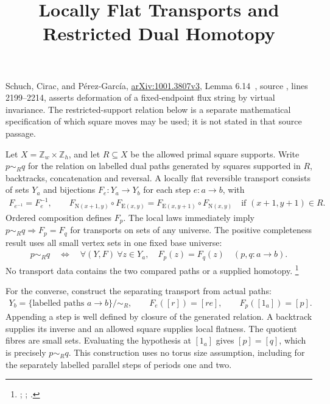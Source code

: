 \documentclass{article}
\title{Locally Flat Transports and Restricted Dual Homotopy}
\author{}
\date{}
\begin{document}
\maketitle
{}

Schuch, Cirac, and P\'erez-Garc\'ia,
\href{https://arxiv.org/abs/1001.3807v3}{arXiv:1001.3807v3},
Lemma 6.14~\cite[Lemma~6.14]{Schuch2010PEPS}, source
, lines 2199--2214,
asserts deformation of a fixed-endpoint flux string by virtual invariance.
The restricted-support relation below is a separate mathematical specification
of which square moves may be used; it is not stated in that source passage.

Let $X=\mathbb Z_w\times\mathbb Z_h$, and let $R\subseteq X$ be the allowed
primal square supports. Write $p\sim_Rq$ for the relation on labelled dual
paths generated by squares supported in $R$, backtracks, concatenation and
reversal. A locally flat reversible transport consists of sets $Y_a$ and
bijections $F_e:Y_a\to Y_b$ for each step $e:a\to b$, with
\begin{align}
    F_{e^{-1}}=F_e^{-1},\qquad
    F_{\mathrm N(x+1,y)}\circ F_{\mathrm E(x,y)}
    =F_{\mathrm E(x,y+1)}\circ F_{\mathrm N(x,y)}
    \quad\text{if }(x+1,y+1)\in R.
    \label{eq:scp10_flat_transport_local}
\end{align}
Ordered composition defines $F_p$. The local laws immediately imply
$p\sim_Rq\Rightarrow F_p=F_q$ for transports on sets of any universe.
The positive completeness result uses all small vertex sets in one fixed
base universe:
\begin{align}
    p\sim_Rq\quad\Longleftrightarrow\quad
    \forall (Y,F)\ \forall z\in Y_a,\quad F_p(z)=F_q(z)
    \quad(p,q:a\to b).
    \label{eq:scp10_flat_transport_complete}
\end{align}
No transport data contains the two compared paths or a supplied homotopy.
\footnote{;
;
.}

For the converse, construct the separating transport from actual paths:
\begin{align}
    Y_b=\{\text{labelled paths }a\to b\}/{\sim_R},\qquad
    F_e([r])=[re],\qquad F_p([1_a])=[p].
    \label{eq:scp10_flat_transport_classes}
\end{align}
Appending a step is well defined by closure of the generated relation.
A backtrack supplies its inverse and an allowed square supplies local
flatness. The quotient fibres are small sets. Evaluating the hypothesis
at $[1_a]$ gives $[p]=[q]$, which is precisely $p\sim_Rq$.
This construction uses no torus size assumption, including for the
separately labelled parallel steps of periods one and two.
\end{document}
